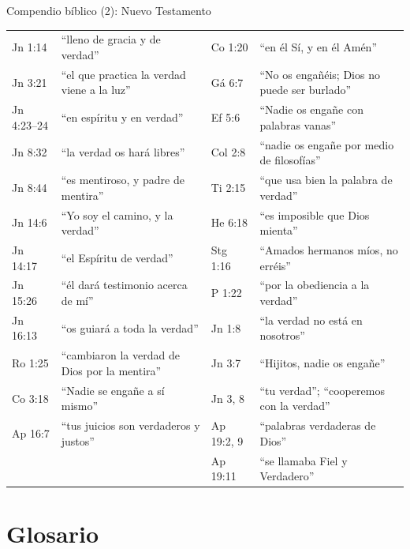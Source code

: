 \documentclass[hyperref={bookmarks=false},aspectratio=169]{beamer}
\begin{document}
\begin{frame}{Compendio bíblico (2): Nuevo Testamento}
\fontsize{6.2}{7.4}\selectfont\renewcommand{\arraystretch}{1.06}
\begin{tabular}{@{}>{\RaggedRight\arraybackslash}p{1.5cm}>{\RaggedRight\arraybackslash}p{4.4cm}|>{\RaggedRight\arraybackslash}p{1.5cm}>{\RaggedRight\arraybackslash}p{4.4cm}@{}}
\toprule
Jn 1:14 & ``lleno de gracia y de verdad'' & 2 Co 1:20 & ``en él Sí, y en él Amén'' \\
Jn 3:21 & ``el que practica la verdad viene a la luz'' & Gá 6:7 & ``No os engañéis; Dios no puede ser burlado'' \\
Jn 4:23--24 & ``en espíritu y en verdad'' & Ef 5:6 & ``Nadie os engañe con palabras vanas'' \\
Jn 8:32 & ``la verdad os hará libres'' & Col 2:8 & ``nadie os engañe por medio de filosofías'' \\
Jn 8:44 & ``es mentiroso, y padre de mentira'' & 2 Ti 2:15 & ``que usa bien la palabra de verdad'' \\
Jn 14:6 & ``Yo soy el camino, y la verdad'' & He 6:18 & ``es imposible que Dios mienta'' \\
Jn 14:17 & ``el Espíritu de verdad'' & Stg 1:16 & ``Amados hermanos míos, no erréis'' \\
Jn 15:26 & ``él dará testimonio acerca de mí'' & 1 P 1:22 & ``por la obediencia a la verdad'' \\
Jn 16:13 & ``os guiará a toda la verdad'' & 1 Jn 1:8 & ``la verdad no está en nosotros'' \\
Ro 1:25 & ``cambiaron la verdad de Dios por la mentira'' & 1 Jn 3:7 & ``Hijitos, nadie os engañe'' \\
1 Co 3:18 & ``Nadie se engañe a sí mismo'' & 3 Jn 3, 8 & ``tu verdad''; ``cooperemos con la verdad'' \\
Ap 16:7 & ``tus juicios son verdaderos y justos'' & Ap 19:2, 9 & ``palabras verdaderas de Dios'' \\
 & & Ap 19:11 & ``se llamaba Fiel y Verdadero'' \\
\bottomrule
\end{tabular}
\end{frame}

\section{Glosario}
\end{document}
